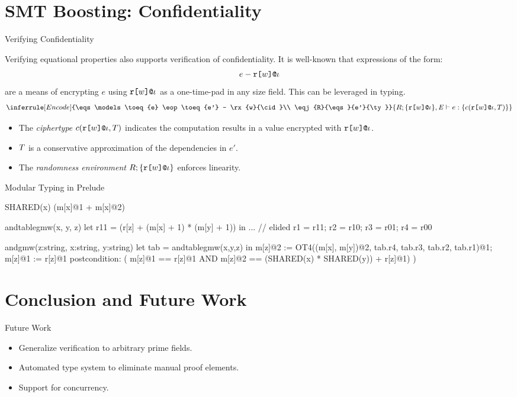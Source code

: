 \documentclass{beamer}
\begin{document}
\section{SMT Boosting: Confidentiality}

\begin{frame}{Verifying Confidentiality}

  Verifying equational properties also supports verification of confidentiality.
  It is well-known that expressions of the form:
  $$
  e - \texttt{r[}w\texttt{]}\texttt{@}\iota
  $$
  are a means of encrypting $e$ using $\texttt{r[}w\texttt{]}\texttt{@}\iota$ as a one-time-pad in any
  size field. This can be leveraged in typing. 
  $$    
  \inferrule[Encode]
  {\eqs \models \toeq{e} \eop \toeq{e'} - \rx{w}{\cid}\\
   \eqj{R}{\eqs}{e'}{\ty}}
  {\eqj{R;\{ \rx{w}{\cid} \}}{\eqs}{e}{\setit{\cty{\rx{w}{\cid}}{\ty}}}}
  $$
  \begin{itemize}
  \item The \emph{ciphertype} $c(\texttt{r[}w\texttt{]}\texttt{@}\iota,T)$ indicates the computation
    results in a value encrypted with $\texttt{r[}w\texttt{]}\texttt{@}\iota$.
  \item $T$ is a conservative approximation of the dependencies in $e'$.
  \item The \emph{randomness environment} $R;\{ \texttt{r[}w\texttt{]}\texttt{@}\iota \}$ enforces
    linearity.
  \end{itemize}
  
\end{frame}

\begin{frame}[fragile]{Modular Typing in Prelude}
  \small{
  \begin{verbatimtab}
SHARED(x) { (m[x]@1 + m[x]@2) }

andtablegmw(x, y, z) {
  let r11 = (r[z] + (m[x] + 1) * (m[y] + 1)) in
  ... // elided
  { r1 = r11; r2 = r10; r3 = r01; r4 = r00 }
}

andgmw(z:string, x:string, y:string) {
  let tab = andtablegmw(x,y,z) in
  m[z]@2 := OT4((m[x], m[y])@2, tab.r4, tab.r3, tab.r2, tab.r1)@1;
  m[z]@1 := r[z]@1
}
postcondition: ( m[z]@1 == r[z]@1 AND
                 m[z]@2 == (SHARED(x) * SHARED(y)) + r[z]@1) ) 
  \end{verbatimtab}
  }
\end{frame}

\section{Conclusion and Future Work}


\begin{frame}{Future Work}

  \begin{itemize}
  \item Generalize verification to arbitrary prime fields.
  \item Automated type system to eliminate manual proof elements.
  \item Support for concurrency.
  \end{itemize}

\end{frame}
\end{document}
